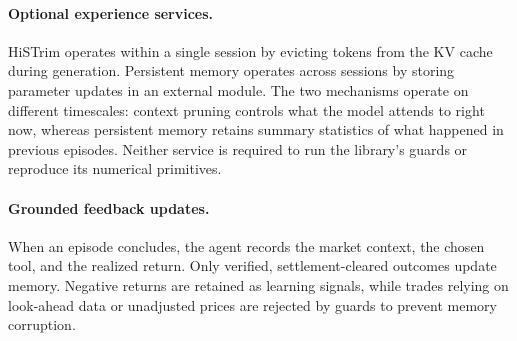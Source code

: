 \paragraph{Optional experience services.}
HiSTrim operates within a single session by evicting tokens from the KV cache during
generation. Persistent memory operates across sessions by storing parameter updates in an
external module. The two mechanisms operate on different timescales: context pruning
controls what the model attends to right now, whereas persistent memory retains summary
statistics of what happened in previous episodes. Neither service is required to run
the library's guards or reproduce its numerical primitives.

\paragraph{Grounded feedback updates.}
When an episode concludes, the agent records the market context, the chosen tool, and the
realized return. Only verified, settlement-cleared outcomes update memory. Negative returns
are retained as learning signals, while trades relying on look-ahead data or unadjusted
prices are rejected by guards to prevent memory corruption.
